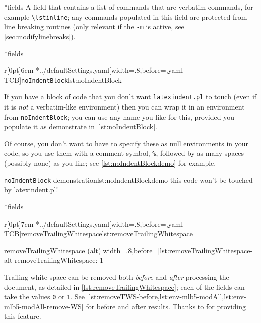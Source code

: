 *{fields}
	A field that contains a list of commands that are verbatim commands, for example
	\lstinline|\lstinline|; any commands populated in this field are protected from line breaking
	routines (only relevant if the \texttt{-m} is active, see \vref{sec:modifylinebreaks}).

*{fields}

	\begin{wrapfigure}[8]{r}[0pt]{6cm}
		\cmhlistingsfromfile[style=noIndentBlock]*{../defaultSettings.yaml}[width=.8\linewidth,before=\centering,yaml-TCB]{\texttt{noIndentBlock}}{lst:noIndentBlock}
	\end{wrapfigure}
	If you have a block of code that you don't want \texttt{latexindent.pl} to touch (even if it is \emph{not} a verbatim-like
	environment) then you can wrap it in an environment from \texttt{noIndentBlock};
	you can use any name you like for this, provided you populate it as demonstrate in
	\cref{lst:noIndentBlock}.

	Of course, you don't want to have to specify these as null environments
	in your code, so you use them with a comment symbol, \lstinline!%!, followed
	by as many spaces (possibly none) as you like; see \cref{lst:noIndentBlockdemo} for
	example.

	\begin{cmhlistings}[style=demo,escapeinside={(*@}{@*)}]{\texttt{noIndentBlock} demonstration}{lst:noIndentBlockdemo}
        this code
                won't
     be touched
                    by
             latexindent.pl!
	\end{cmhlistings}

*{fields}\label{yaml:removeTrailingWhitespace}

	\begin{wrapfigure}[10]{r}[0pt]{7cm}
		\cmhlistingsfromfile[style=removeTrailingWhitespace]*{../defaultSettings.yaml}[width=.8\linewidth,before=\centering,yaml-TCB]{removeTrailingWhitespace}{lst:removeTrailingWhitespace}

		\vspace{.1cm}
		\begin{yaml}[numbers=none]{removeTrailingWhitespace (alt)}[width=.8\linewidth,before=\centering]{lst:removeTrailingWhitespace-alt}
removeTrailingWhitespace: 1
\end{yaml}
	\end{wrapfigure}
	Trailing white space can be removed both \emph{before} and \emph{after} processing
	the document, as detailed in \cref{lst:removeTrailingWhitespace}; each of the fields
	can take the values \texttt{0} or \texttt{1}. See \vref{lst:removeTWS-before,lst:env-mlb5-modAll,lst:env-mlb5-modAll-remove-WS}
	for before and after results.  Thanks to \cite{vosskuhle} for providing this feature.

